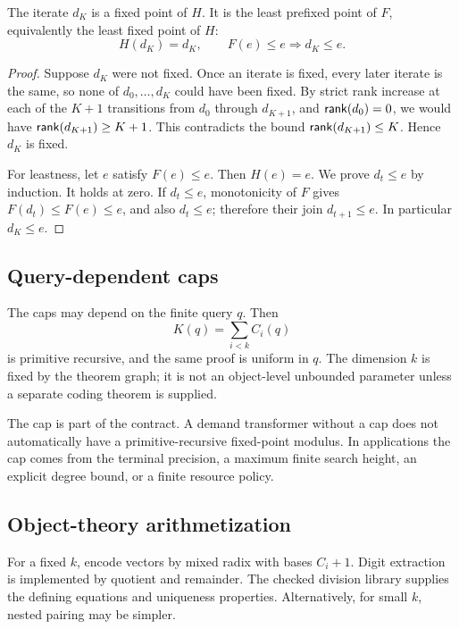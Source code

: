 \begin{theorem}
\label{thm:demand-closure}
The iterate \(d_K\) is a fixed point of \(H\).  It is the least prefixed point of \(F\), equivalently the least fixed point of \(H\):
\[
 H(d_K)=d_K,
 \qquad
 F(e)\le e\Longrightarrow d_K\le e.
\]
\end{theorem}
\begin{proof}
Suppose \(d_K\) were not fixed.  Once an iterate is fixed, every later iterate is the same, so none of \(d_0,\ldots,d_K\) could have been fixed.  By strict rank increase at each of the \(K+1\) transitions from \(d_0\) through \(d_{K+1}\), and \(\mathsf{rank}(d_0)=0\), we would have \(\mathsf{rank}(d_{K+1})\ge K+1\).  This contradicts the bound \(\mathsf{rank}(d_{K+1})\le K\).  Hence \(d_K\) is fixed.

For leastness, let \(e\) satisfy \(F(e)\le e\).  Then \(H(e)=e\).  We prove \(d_t\le e\) by induction.  It holds at zero.  If \(d_t\le e\), monotonicity of \(F\) gives \(F(d_t)\le F(e)\le e\), and also \(d_t\le e\); therefore their join \(d_{t+1}\le e\).  In particular \(d_K\le e\).
\end{proof}

\subsection{Query-dependent caps}

The caps may depend on the finite query \(q\).  Then
\[
  K(q)=\sum_{i<k}C_i(q)
\]
is primitive recursive, and the same proof is uniform in \(q\).  The dimension \(k\) is fixed by the theorem graph; it is not an object-level unbounded parameter unless a separate coding theorem is supplied.

The cap is part of the contract.  A demand transformer without a cap does not automatically have a primitive-recursive fixed-point modulus.  In applications the cap comes from the terminal precision, a maximum finite search height, an explicit degree bound, or a finite resource policy.

\subsection{Object-theory arithmetization}

For a fixed \(k\), encode vectors by mixed radix with bases \(C_i+1\).  Digit extraction is implemented by quotient and remainder.  The checked division library supplies the defining equations and uniqueness properties.  Alternatively, for small \(k\), nested pairing may be simpler.

